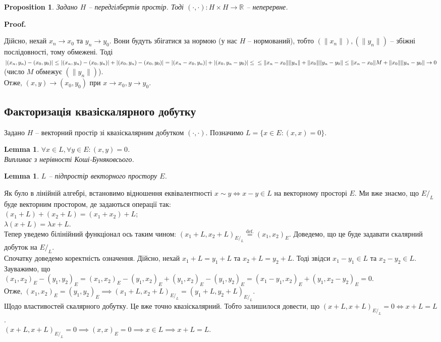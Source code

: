\documentclass[a4paper, 10pt]{article}
\makeatletter
\theoremstyle{theoremdd}
\theoremstyle{theoremdd}
\theoremstyle{theoremdd}
\theoremstyle{theoremdd}
\theoremstyle{theoremdd}
\newtheorem{proposition}[theorem]{Proposition}
\theoremstyle{theoremdd}
\theoremstyle{theoremdd}
\newtheorem{lemma}[theorem]{Lemma}
\theoremstyle{theoremdd}
\renewenvironment{proof}[1][Proof.\\]{\par
\pushQED{\hfill \qed}%
\normalfont \topsep6\p@\@plus6\p@\relax
\trivlist
\item\relax
{\bfseries
#1\@addpunct{.}}\hspace\labelsep\ignorespaces
}{%
\popQED\endtrivlist\@endpefalse
}
\makeatother
\begin{document}
\begin{proposition}
Задано $H$ -- передгілбертів простір. Тоді $(\cdot, \cdot) \colon H \times H \to \mathbb{R}$ -- неперервне.
\end{proposition}

\begin{proof}
Дійсно, нехай $x_n \to x_0$ та $y_n \to y_0$. Вони будуть збігатися за нормою (у нас $H$ -- нормований), тобто $(\|x_n\|), (\|y_n\|)$ -- збіжні послідовності, тому обмежені. Тоді\\
$|(x_n,y_n) - (x_0,y_0)| \leq |(x_n,y_n) - (x_0,y_n)| + |(x_0,y_n) - (x_0,y_0)| = |(x_n-x_0,y_n)| + |(x_0,y_n-y_0)| \leq \\
\leq \|x_n-x_0\| \|y_n\| + \|x_0\| \|y_n-y_0\| \leq \|x_n - x_0\| M + \|x_0\| \|y_n-y_0\| \to 0$ (число $M$ обмежує $(\|y_n\|)$).\\
Отже, $(x,y) \to (x_0,y_0)$ при $x \to x_0, y \to y_0$.
\end{proof}

\subsection{Факторизація квазіскалярного добутку}
Задано $H$ -- векторний простір зі квазіскалярним добутком $(\cdot,\cdot)$. Позначимо $L = \{x \in E: (x,x) = 0\}$.

\begin{lemma}
$\forall x \in L, \forall y \in E: (x,y) = 0$.\\
\textit{Випливає з нерівності Коші-Буняковсього}.
\end{lemma}

\begin{lemma}
$L$ -- підпростір векторного простору $E$.
\end{lemma}
\noindent
Як було в лінійній алгебрі, встановимо відношення еквівалентності $x \sim y \iff x - y \in L$ на векторному просторі $E$. Ми вже знаємо, що $E/_L$ буде векторним простором, де задаються операції так:\\
$(x_1+L) + (x_2+L) = (x_1+x_2) + L$;\\
$\lambda(x+L) = \lambda x + L$.\\
Тепер уведемо білінійний функціонал ось таким чином: $(x_1+L,x_2+L)_{E/_L} \overset{\text{def.}}{=} (x_1,x_2)_E$. Доведемо, що це буде задавати скалярний добуток на $E/_L$.\\
Спочатку доведемо коректність означення. Дійсно, нехай $x_1+L = y_1+L$ та $x_2+L = y_2+L$. Тоді звідси $x_1-y_1 \in L$ та $x_2-y_2 \in L$. Зауважимо, що\\
$(x_1,x_2)_E - (y_1,y_2)_E = (x_1,x_2)_E - (y_1,x_2)_E + (y_1,x_2)_E - (y_1,y_2)_E = (x_1-y_1,x_2)_E + (y_1,x_2-y_2)_E = 0$.\\
Отже, $(x_1,x_2)_E = (y_1,y_2)_E \implies (x_1+L,x_2+L)_{E/_L} = (y_1+L,y_2+L)_{E/_L}$.\\
Щодо властивостей скалярного добутку. Це вже точно квазіскалярний. Тобто залишилося довести, що $(x+L,x+L)_{E/_L} = 0 \iff x+L = L$.\\
$(x+L,x+L)_{E/_L} = 0 \implies (x,x)_E = 0 \implies x \in L \implies x+L = L$. 
\end{document}
